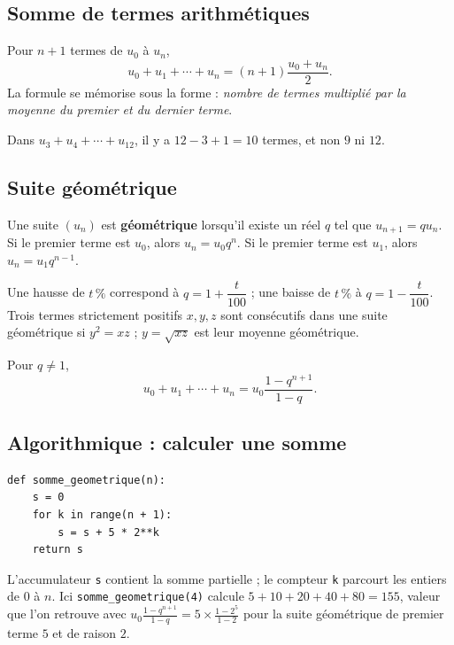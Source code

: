 \subsection{Somme de termes arithmétiques}
Pour $n+1$ termes de $u_0$ à $u_n$,
\[
u_0+u_1+\cdots+u_n=(n+1)\frac{u_0+u_n}{2}.
\]
La formule se mémorise sous la forme : \emph{nombre de termes multiplié par la moyenne du premier et du dernier terme}.

\begin{pitfall}
Dans $u_3+u_4+\cdots+u_{12}$, il y a $12-3+1=10$ termes, et non $9$ ni $12$.
\end{pitfall}

\subsection{Suite géométrique}
\begin{keypoint}
Une suite $(u_n)$ est \textbf{géométrique} lorsqu'il existe un réel $q$ tel que $u_{n+1}=q u_n$. Si le premier terme est $u_0$, alors $u_n=u_0q^n$. Si le premier terme est $u_1$, alors $u_n=u_1q^{n-1}$.
\end{keypoint}

\begin{center}
\end{center}

Une hausse de $t\,\%$ correspond à $q=1+\dfrac{t}{100}$ ; une baisse de $t\,\%$ à $q=1-\dfrac{t}{100}$. Trois termes strictement positifs $x,y,z$ sont consécutifs dans une suite géométrique si $y^2=xz$ ; $y=\sqrt{xz}$ est leur moyenne géométrique.

Pour $q\neq1$,
\[
u_0+u_1+\cdots+u_n=u_0\frac{1-q^{n+1}}{1-q}.
\]

\subsection{Algorithmique : calculer une somme}
\begin{lstlisting}[style=python]
def somme_geometrique(n):
    s = 0
    for k in range(n + 1):
        s = s + 5 * 2**k
    return s
\end{lstlisting}
L'accumulateur \texttt{s} contient la somme partielle ; le compteur \texttt{k} parcourt les entiers de $0$ à $n$. Ici \texttt{somme\_geometrique(4)} calcule $5+10+20+40+80=155$, valeur que l'on retrouve avec $u_0\frac{1-q^{n+1}}{1-q}=5\times\frac{1-2^5}{1-2}$ pour la suite géométrique de premier terme $5$ et de raison $2$.

